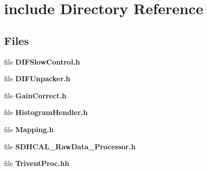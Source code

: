 \section{include Directory Reference}
\label{dir_ed0932e57016a2b3f5a418b2c69e948a}
\subsection*{Files}
\begin{DoxyCompactItemize}
\item 
file {\bfseries D\-I\-F\-Slow\-Control.\-h}
\item 
file {\bfseries D\-I\-F\-Unpacker.\-h}
\item 
file {\bfseries Gain\-Correct.\-h}
\item 
file {\bfseries Histogram\-Hendler.\-h}
\item 
file {\bfseries Mapping.\-h}
\item 
file {\bfseries S\-D\-H\-C\-A\-L\-\_\-\-Raw\-Data\-\_\-\-Processor.\-h}
\item 
file {\bfseries Trivent\-Proc.\-hh}
\end{DoxyCompactItemize}

